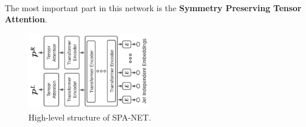 \\
The most important part in this network is the \textbf{Symmetry Preserving Tensor Attention}.

\begin{figure}[h]
	\centering
	\includegraphics[width=0.48\textwidth,angle=270]{Figures/NetworkDiagramAlt.pdf}
	\caption{ High-level structure of SPA-NET.}
	\label{fig:architecture}
\end{figure}
